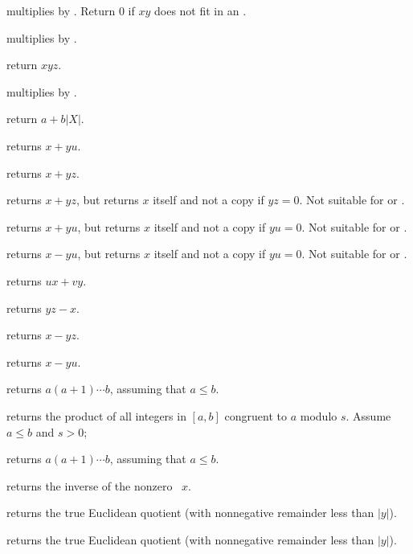  multiplies  by .
Return $0$ if $xy$ does not fit in an .

 multiplies  by .

 return $xyz$.

 multiplies  by .

 return $a + b|X|$.

 returns $x +yu$.

 returns $x + yz$.

 returns $x + yz$, but
returns $x$ itself and not a copy if $yz = 0$. Not suitable for
 or .

 returns $x +yu$, but
returns $x$ itself and not a copy if $yu = 0$. Not suitable for
 or .

 returns $x- yu$, but
returns $x$ itself and not a copy if $yu = 0$. Not suitable for
 or .

 returns $ux + vy$.

 returns $yz - x$.

 returns $x - yz$.

 returns $x -yu$.

 returns $a(a+1)\cdots b$, assuming
that $a \leq b$.

 returns the product
of all integers in $[a,b]$ congruent to $a$ modulo $s$. Assume $a\leq b$ and
$s > 0$;

 returns $a(a+1)\cdots b$, assuming
that $a \leq b$.

 returns the inverse of the nonzero ~$x$.

 returns the true Euclidean quotient
(with nonnegative remainder less than $|y|$).

 returns the true Euclidean quotient
(with nonnegative remainder less than $|y|$).


